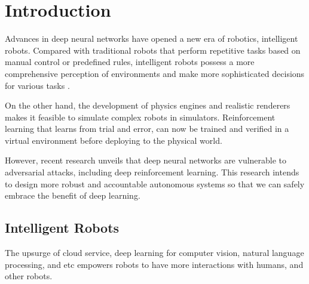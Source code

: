 \chapter{Introduction}
\label{chpt:intro}

Advances in deep neural networks have opened a new era of robotics, intelligent robots. Compared with traditional robots that perform repetitive tasks based on manual control or predefined rules, intelligent robots possess a more comprehensive perception of environments and make more sophisticated decisions for various tasks \cite{wang2018current}.

On the other hand, the development of physics engines and realistic renderers makes it feasible to simulate complex robots in simulators. Reinforcement learning that learns from trial and error, can now be trained and verified in a virtual environment before deploying to the physical world.

However, recent research unveils that deep neural networks are vulnerable to adversarial attacks, including deep reinforcement learning. This research intends to design more robust and accountable autonomous systems so that we can safely embrace the benefit of deep learning.


\section{Intelligent Robots}
\label{sec:intelligent_robot}

The upsurge of cloud service, deep learning for computer vision, natural language processing,  and etc empowers robots to have more interactions with humans, and other robots. 

